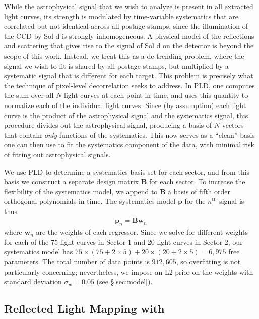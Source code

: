 \documentclass[modern]{aastex62}
\begin{document}
While the astrophysical signal that we wish to analyze is present in all 
extracted light curves, its strength is modulated by time-variable systematics 
that are correlated but not identical across all postage stamps, since the
illumination of the CCD by Sol d is strongly inhomogeneous. A physical
model of the reflections and scattering that gives rise to the
signal of Sol d on the \TESS detector is beyond the scope of this work. Instead,
we treat this as a de-trending problem, where the signal we wish to fit is
shared by all postage stamps, but multiplied by a systematic signal that is
different for each target. This problem is precisely what the technique of
pixel-level decorrelation \citep[PLD;][]{Deming2015, Luger2016, Luger2018a}
seeks to address. In PLD, one computes the sum over all $N$ light curves at each
point in time, and uses this quantity to normalize each of the individual
light curves. Since (by assumption) each light curve is the product of the astrophysical
signal and the systematics signal, this procedure divides out the astrophysical
signal, producing a basis of $N$ vectors that contain \emph{only} functions of the
systematics. This now serves as a ``clean'' basis one can then use to fit the 
systematics component of the data, with minimal risk of fitting out astrophysical signals. 

We use PLD to determine a systematics basis set for each \TESS sector, and
from this basis we construct a separate design matrix $\mathbf{B}$ for each sector. To
increase the flexibility of the systematics model, we append to $\mathbf{B}$ a basis of
fifth order orthogonal polynomials in time.
The systematics model $\mathbf{p}$ for the $n^\mathrm{th}$ signal is thus
%
\begin{align}
\mathbf{p}_n = \mathbf{B} \mathbf{w}_n
\end{align}
%
where $\mathbf{w}_n$ are the weights of each regressor.
Since we solve for different weights for each of the 75 light curves in Sector 1
and 20 light curves in Sector 2, our systematics model has
$75 \times (75 + 2 \times 5) + 20 \times (20 + 2 \times 5) = 6,975$ free parameters.
The total number of data points is $912,605$, so overfitting is not particularly
concerning; nevertheless, we impose an L2 prior on the weights with
standard deviation $\sigma_w = 0.05$ (see \S\ref{sec:model}).

\subsection{Reflected Light Mapping with \starry}
\label{sec:starry}
\end{document}
